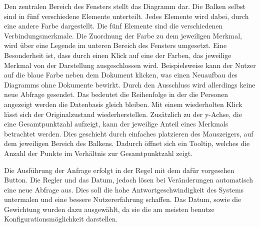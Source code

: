 Den zentralen Bereich des Fensters stellt das Diagramm dar. Die Balken selbst sind in fünf verschiedene Elemente unterteilt. Jedes Elemente wird dabei, durch eine andere Farbe dargestellt. Die fünf Elemente sind die verschiedenen Verbindungsmerkmale. Die Zuordnung der Farbe zu dem jeweiligen Merkmal, wird über eine Legende im unteren Bereich des Fensters umgesetzt. Eine Besonderheit ist, dass durch einen Klick auf eine der Farben, das jeweilige Merkmal von der Darstellung ausgeschlossen wird. Beispielsweise kann der Nutzer auf die blaue Farbe neben dem Dokument klicken, was einen Neuaufbau des Diagramms ohne Dokumente bewirkt. Durch den Ausschluss wird allerdings keine neue Abfrage gesendet. Das  bedeutet die Reihenfolge in der die Personen angezeigt werden die Datenbasis gleich  bleiben. Mit einem wiederholten Klick lässt sich der Originalzustand wiederherstellen. Zusätzlich zu der y-Achse, die eine Gesamtpunktzahl aufzeigt, kann der jeweilige Anteil eines Merkmals betrachtet werden. Dies geschieht durch einfaches platzieren des Mauszeigers, auf dem jeweiligen Bereich des Balkens. Dadurch öffnet sich ein Tooltip, welches die Anzahl der Punkte im Verhältnis zur Gesamtpunktzahl zeigt.

Die Ausführung der Anfrage erfolgt in der Regel mit dem dafür vorgesehen Button. Die Regler und das Datum, jedoch lösen bei Veränderungen automatisch eine neue Abfrage aus. Dies soll die hohe Antwortgeschwindigkeit des Systems untermalen und eine bessere Nutzererfahrung schaffen. Das Datum, sowie die Gewichtung wurden dazu ausgewählt, da sie die am meisten benutze Konfigurationsmöglichkeit darstellen.